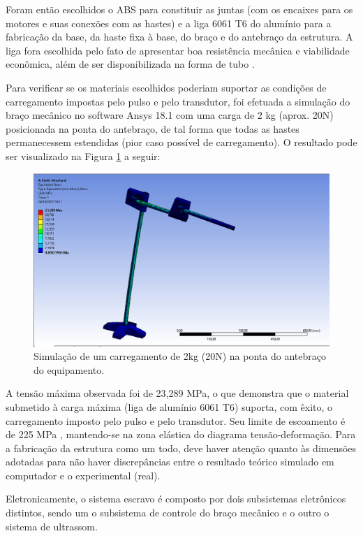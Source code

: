Foram então escolhidos o ABS para constituir as juntas (com os encaixes para os motores e suas conexões com as hastes) e a liga 6061 T6 do alumínio para a fabricação da base, da haste fixa à base, do braço e do antebraço da estrutura. A liga fora escolhida pelo fato de apresentar boa resistência mecânica e viabilidade econômica, além de ser disponibilizada na forma de tubo \cite{bracomec}\cite{materialt6}.

Para verificar se os materiais escolhidos poderiam suportar as condições de carregamento impostas pelo pulso e pelo transdutor, foi efetuada a simulação do braço mecânico no software Ansys 18.1 com uma carga de 2 kg (aprox. 20N) posicionada na ponta do antebraço, de tal forma que todas as hastes permanecessem estendidas (pior caso possível de carregamento). O resultado pode ser visualizado na Figura \ref{des_fig13} a seguir:

\begin{figure}[H]
	\centering	\includegraphics[keepaspectratio=true,scale=0.5]{figuras/braco_mecanico_8.png}
	\caption{Simulação de um carregamento de 2kg (20N) na ponta do antebraço do equipamento. }
	\label{des_fig13}
\end{figure}
A tensão máxima observada foi de 23,289 MPa, o que demonstra que o material submetido à carga máxima (liga de alumínio 6061 T6) suporta, com êxito, o carregamento imposto pelo pulso e pelo transdutor. Seu limite de escoamento é de 225 MPa \cite{materialt6}, mantendo-se na zona elástica do diagrama tensão-deformação. Para a fabricação da estrutura como um todo, deve haver atenção quanto às dimensões adotadas para não haver discrepâncias entre o resultado teórico simulado em computador e o experimental (real). 

Eletronicamente, o sistema escravo é composto por dois subsistemas eletrônicos distintos, sendo um o subsistema de controle do braço mecânico e o outro o sistema de ultrassom.
   
